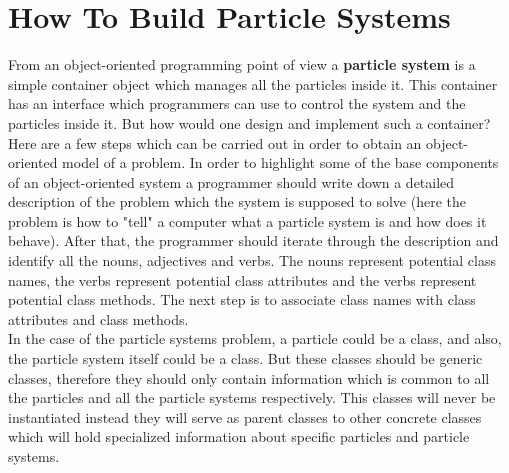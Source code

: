 \section{How To Build Particle Systems}
From an object-oriented programming point of view a \textbf{particle system} is a simple container object which manages all the particles inside it. This container has an interface which programmers can use to control the system and the particles inside it. But how would one design and implement such a container?\\

Here are a few steps which can be carried out in order to obtain an object-oriented model of a problem. In order to highlight some of the base components of an object-oriented system a programmer should write down a detailed description of the problem which the system is supposed to solve (here the problem is how to "tell" a computer what a particle system is and how does it behave). After that, the programmer should iterate through the description and identify all the nouns, adjectives and verbs. The nouns represent potential class names, the verbs represent potential class attributes and the verbs represent potential class methods. The next step is to associate class names with class attributes and class methods.\\

In the case of the particle systems problem, a particle could be a class, and also, the particle system itself could be a class. But these classes should be generic classes, therefore they should only contain information which is common to all the particles and all the particle systems respectively. This classes will never be instantiated instead they will serve as parent classes to other concrete classes which will hold specialized information about specific particles and particle systems.